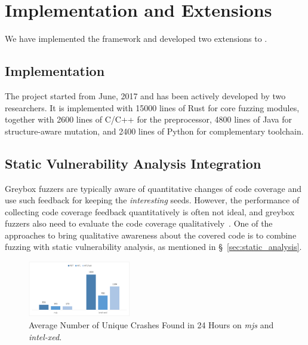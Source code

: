  

\section{Implementation and Extensions}\label{sec:app}

We have implemented the {\FOT} framework and developed two extensions to {\FOT}.

\subsection{Implementation}

The {\FOT} project started from June, 2017 and has been actively developed by two researchers. It is implemented with 15000 lines of Rust for core fuzzing modules, together with 2600 lines of C/C++ for the preprocessor, 4800 lines of Java for structure-aware mutation, and 2400 lines of Python for complementary toolchain.





\subsection{Static Vulnerability Analysis Integration}\label{subsec:sva}



Greybox fuzzers are typically aware of quantitative changes of code coverage and use such feedback for keeping the \textit{interesting} seeds.
However, the performance of collecting code coverage feedback quantitatively is often not ideal, and greybox fuzzers also need to evaluate the code coverage qualitatively~\cite{Bohme:2016:CGF}.
One of the approaches to bring qualitative awareness about the covered code is to combine fuzzing with static vulnerability analysis, as mentioned in \S~\ref{sec:static_analysis}.

\begin{figure}[!t]
	\centering
	\includegraphics[width=0.4\textwidth]{res/fot/moo_result.pdf}
	\caption{Average Number of Unique Crashes Found in 24 Hours on \textit{mjs} and \textit{intel-xed}.}
	\label{fig:moo_result}
\end{figure}


